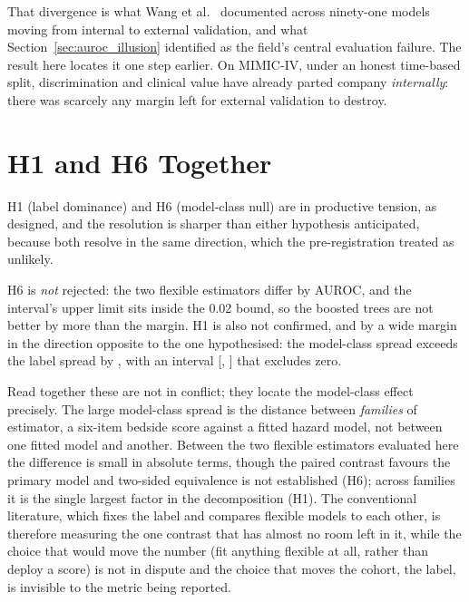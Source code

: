 That divergence is what Wang et al.\ \cite{wang2025srpm} documented across
ninety-one models moving from internal to external validation, and what
Section~\ref{sec:auroc_illusion} identified as the field's central evaluation
failure. The result here locates it one step earlier. On MIMIC-IV, under an
honest time-based split, discrimination and clinical value have already parted
company \emph{internally}: there was scarcely any margin left for external
validation to destroy.


\section{H1 and H6 Together}
\label{sec:discussion_h1h6}

H1 (label dominance) and H6 (model-class null) are in productive tension, as
designed, and the resolution is sharper than either hypothesis anticipated,
because both resolve in the same direction, which the pre-registration treated
as unlikely.

H6 is \emph{not} rejected: the two flexible estimators differ by
\pcHSixAbsEst{} AUROC, and the interval's upper limit sits inside the 0.02
bound, so the boosted trees are not better by more than the margin. H1 is also not
confirmed, and by a wide margin in the direction opposite to the one
hypothesised: the model-class spread \pcSpreadModelClass{} exceeds the label
spread \pcSpreadLabel{} by \pcHOneEst, with an interval
[\pcHOneCiLo, \pcHOneCiHi] that excludes zero.

Read together these are not in conflict; they locate the model-class effect
precisely. The large model-class spread is the distance between \emph{families}
of estimator, a six-item bedside score against a fitted hazard model, not
between one fitted model and another. Between the two flexible estimators
evaluated here the difference is small in absolute terms, though the paired
contrast favours the primary model and two-sided equivalence is not established
(H6); across families it is the single largest factor in the decomposition
(H1). The conventional literature, which fixes the label and
compares flexible models to each other, is therefore measuring the one contrast
that has almost no room left in it, while the choice that would move the number (fit anything flexible at all, rather than deploy a score) is not in
dispute and the choice that moves the cohort, the label, is invisible to
the metric being reported.

